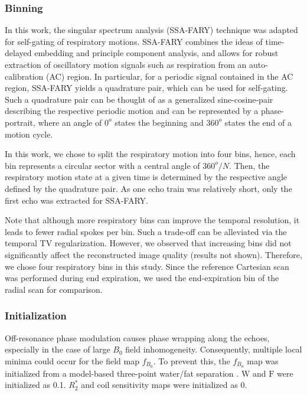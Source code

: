 \documentclass[journal,twoside,web]{ieeecolor}
\begin{document}
\subsubsection*{Binning}

In this work, the singular spectrum analysis (SSA-FARY) technique 
\cite{rosenzweig_2020_ssa} 
was adapted for self-gating of respiratory motions. 
SSA-FARY combines the ideas of time-delayed embedding and principle component analysis, 
and allows for robust extraction of oscillatory motion signals 
such as respiration from an auto-calibration (AC) region. 
In particular, for a periodic signal contained in the AC region, 
SSA-FARY yields a quadrature pair, which can be used for self-gating. 
Such a quadrature pair can be thought of as a generalized sine-cosine-pair 
describing the respective periodic motion and can be represented by a phase-portrait, 
where an angle of $0^o$ states the beginning and $360^o$ states the end of a motion cycle. 

In this work, we chose to split the respiratory motion into four bins, 
hence, each bin represents a circular sector with a central angle of $360^o / N$. 
Then, the respiratory motion state at a given time is determined by 
the respective angle defined by the quadrature pair.
As one echo train was relatively short, 
only the first echo was extracted for SSA-FARY.

Note that although more respiratory bins can improve the temporal resolution, 
it leads to fewer radial spokes per bin. Such a trade-off can be alleviated 
via the temporal TV regularization. However, we observed that increasing bins 
did not significantly affect the reconstructed image quality (results not shown). 
Therefore, we chose four respiratory bins in this study.
Since the reference Cartesian scan was performed during end expiration, 
we used the end-expiration bin of the radial scan for comparison.

\subsubsection*{Initialization}

Off-resonance phase modulation causes phase wrapping along the echoes, 
especially in the case of large $B_0$ field inhomogeneity. 
Consequently, multiple local minima could occur for the field map $f_{B_0}$. 
To prevent this, the $f_{B_0}$ map was initialized 
from a model-based three-point water/fat separation \cite{tan_2019_mobawf}. 
$\mathrm{W}$ and $\mathrm{F}$ were initialized as \num{0.1}. 
${R_2^*}$ and coil sensitivity maps were initialized as \num{0}.
\end{document}
